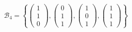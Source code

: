 {\begin{multicols}{2}
\begin{iii}
\item $ \mathcal{B}_4 =
\left\{ \left(\begin{array}{r} 1 \\ 1 \\ 0 \end{array}\right),
\left(\begin{array}{r} 0 \\ 1 \\ 1 \end{array}\right),
\left(\begin{array}{r} 1 \\ 0 \\ 1 \end{array}\right),
\left(\begin{array}{r} 1 \\ 1 \\ 1 \end{array}\right) \right\} $
\end{iii}
\end{multicols}

}


